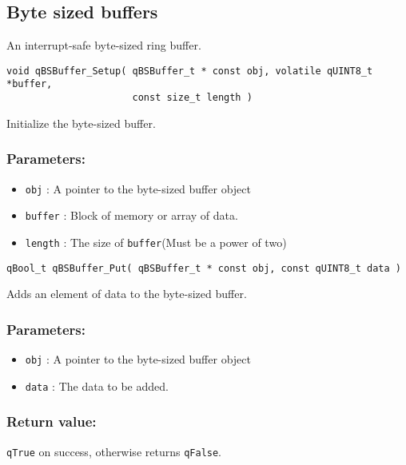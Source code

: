 \subsection{Byte sized buffers}

An interrupt-safe byte-sized ring buffer.
\medskip

\begin{lstlisting}[style=CStyle]
void qBSBuffer_Setup( qBSBuffer_t * const obj, volatile qUINT8_t *buffer, 
                      const size_t length )
\end{lstlisting}

Initialize the byte-sized buffer. 

\subsubsection*{Parameters:}
\begin{itemize}
    \item \lstinline{obj} : A pointer to the byte-sized buffer object
    \item \lstinline{buffer} : Block of memory or array of data.
    \item \lstinline{length} : The size of \lstinline{buffer}(Must be a power of two)
\end{itemize}

\noindent\hrulefill

\begin{lstlisting}[style=CStyle]
qBool_t qBSBuffer_Put( qBSBuffer_t * const obj, const qUINT8_t data )
\end{lstlisting}

Adds an element of data to the byte-sized buffer. 

\subsubsection*{Parameters:}
\begin{itemize}
    \item \lstinline{obj} : A pointer to the byte-sized buffer object
    \item \lstinline{data} : The data to be added.
\end{itemize}

\subsubsection*{Return value:}
\lstinline{qTrue} on success, otherwise returns \lstinline{qFalse}.

